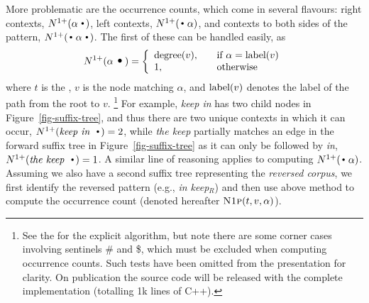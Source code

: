 More problematic are the occurrence counts, which come in several
flavours: right contexts, $\nlplus{\patdot}$,
left contexts,  $\nlplus{\dotpat}$, and contexts to both sides of the pattern,
$\nlplus{\dotpatdot}$. 
The first of these can be handled easily, as 
\begin{equation*}
\nlplus{\patdot} = \left\{ 
\begin{array}{ll}
   \degree{t}{v}, \quad & \text{if~} \alpha = \pathlabel{t}{v} \\
   1, & \text{otherwise}
\end{array} \right.
\end{equation*}
where $t$ is the \CST, $v$ is the node matching $\alpha$, and 
$\pathlabel{t}{v}$ denotes the label of the path from the root to $v$.%
\footnote{See the \supp for the explicit algorithm, but note there are some corner cases involving sentinels \#
  and \$, which must be excluded when computing occurrence counts.
  Such tests have been omitted from the presentation for clarity. On publication the
  source code will be released with the complete implementation (totalling 1k lines of C++).}
For example, \emph{keep in} has two child nodes in  Figure~\ref{fig-suffix-tree},
and thus there are two unique contexts in which it can occur, $\nlplus{\emph{keep in~}\Bigcdot}=2$,
while \emph{the keep} partially matches an edge in the forward suffix tree in
Figure~\ref{fig-suffix-tree} as it can only be followed by \emph{in}, $\nlplus{\emph{the keep~}\Bigcdot}=1$.
A similar line of reasoning applies to computing $\nlplus{\dotpat}$. 
Assuming we also have a second suffix tree representing the \emph{reversed corpus}, we first identify the reversed pattern (e.g., \emph{in keep}$_R$) and then use above method to compute the occurrence count (denoted hereafter $\nlplusfunc{t}{v}{\alpha}$). 

